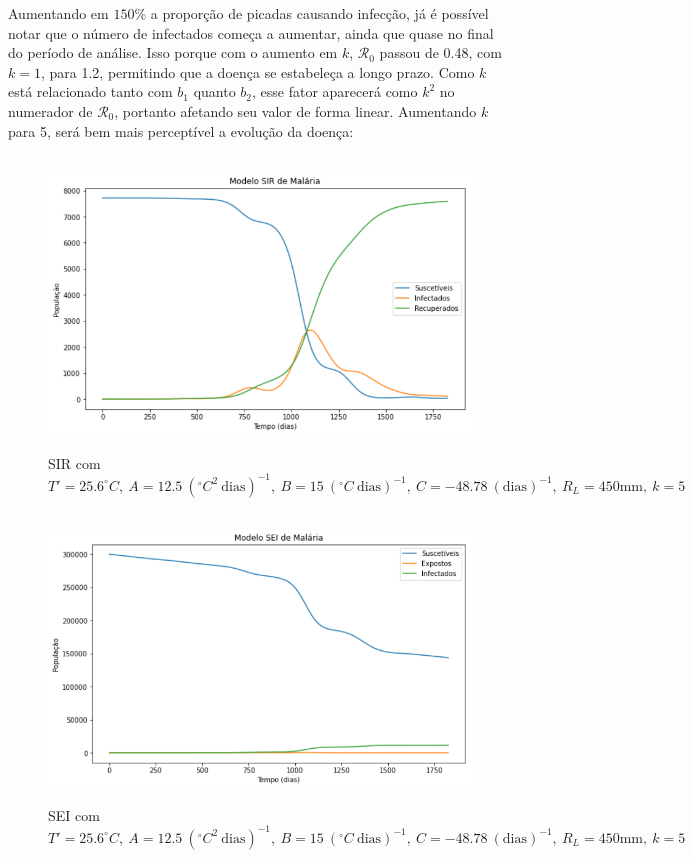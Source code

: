 \newpage
Aumentando em $150\%$ a proporção de picadas causando infecção, já é possível notar que o 
número de infectados começa a aumentar, ainda que quase no final do período 
de análise. Isso porque com o aumento em $k$, $\mathcal{R}_0$ passou de 0.48, 
com $k=1$, para 1.2, permitindo que a doença se estabeleça a longo prazo. Como $k$
está relacionado tanto com $b_1$ quanto $b_2$, esse fator aparecerá como $k^2$ no
numerador de $\mathcal{R}_0$, portanto afetando seu valor de forma linear.
Aumentando $k$ para 5, será bem mais perceptível a evolução da doença:
\begin{figure}[!ht]
        \centering
        \hbox{\hspace{3.7em} \includegraphics[scale=0.6] {Correcao_SIR_Desmat_k=5.png}}
        \caption{SIR com $T'=25.6 ^\circ C, \ A=12.5 \ (^\circ C^2 \ \text{dias})^{-1}, \ B=15 \ (^\circ C \ \text{dias})^{-1}, \ C=-48.78 \ (\text{dias})^{-1}, \ R_L=450 \text{mm}, \ k=5$}
\end{figure} 
\begin{figure}[!ht]
        \centering
        \hbox{\hspace{3.2em} \includegraphics[scale=0.6] {Correcao_SEI_Desmat_k=5.png}}
        \caption{SEI com $T'=25.6 ^\circ C, \ A=12.5 \ (^\circ C^2 \ \text{dias})^{-1}, \ B=15 \ (^\circ C \ \text{dias})^{-1}, \ C=-48.78 \ (\text{dias})^{-1}, \ R_L=450 \text{mm}, \ k=5$}
\end{figure} 
